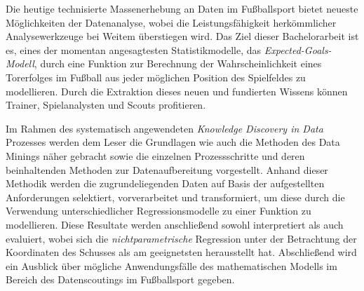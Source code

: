 %
%
\seKurzfassung{} %


Die heutige technisierte Massenerhebung an Daten im Fußballsport bietet neueste Möglichkeiten der Datenanalyse, wobei die Leistungsfähigkeit herkömmlicher Analysewerkzeuge bei Weitem überstiegen wird. Das Ziel dieser Bachelorarbeit ist es, eines der momentan angesagtesten Statistikmodelle, das \textit{Expected-Goals-Modell}, durch eine Funktion zur Berechnung der Wahrscheinlichkeit eines Torerfolges im Fußball aus jeder möglichen Position des Spielfeldes zu modellieren. Durch die Extraktion dieses neuen und fundierten Wissens können Trainer, Spielanalysten und Scouts profitieren.

Im Rahmen des systematisch angewendeten \textit{Knowledge Discovery in Data} Prozesses werden dem Leser die Grundlagen wie auch die Methoden des Data Minings näher gebracht sowie die einzelnen Prozessschritte und deren beinhaltenden Methoden zur Datenaufbereitung vorgestellt. Anhand dieser Methodik werden die zugrundeliegenden Daten auf Basis der aufgestellten Anforderungen selektiert, vorverarbeitet und transformiert, um diese durch die Verwendung unterschiedlicher Regressionsmodelle zu einer Funktion zu modellieren. Diese Resultate werden anschließend sowohl interpretiert als auch evaluiert, wobei sich die \textit{nichtparametrische} Regression unter der Betrachtung der Koordinaten des Schusses als am geeignetsten herausstellt hat. Abschließend wird ein Ausblick über mögliche Anwendungsfälle des mathematischen Modells im Bereich des Datenscoutings im Fußballsport gegeben.